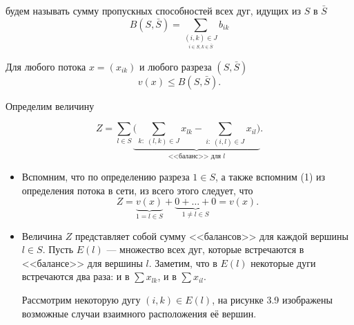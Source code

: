  будем называть сумму пропускных способностей всех дуг, идущих из $S$ в $\bar{S}$
\[
B(S, \bar{S}) = \sum_{\underset{i \in S, k \in \bar{S}}{(i, k) \in J}} b_{ik}
\]


Для любого потока $x = (x_{ik})$ и любого разреза $(S, \bar{S})$
\[
v(x) \le B(S, \bar{S}).
\]

\prooof

Определим величину

\[
Z = \sum_{l \in S} \underbrace{\bigg(\sum_{k:\;(l, k) \in J} x_{lk} - \sum_{i: \; (i, l) \in J} x_{il}\bigg)}_{\text{<<баланс>> для } l}.
\]

\begin{itemize}[nosep]
	\item[\fbox{1}] Вспомним, что по определению разреза $1 \in S$, а также вспомним (1) из определения потока в сети, из всего этого следует, что
	\[
	Z = \underbrace{v(x)}_{1 = l \in S} + \underbrace{0 + \dots + 0}_{1 \neq l \in S} = v(x).
	\]

	\item[\fbox{2}] Величина $Z$ представляет собой сумму <<балансов>> для каждой вершины $l \in S$. Пусть $E(l)$ --- множество всех дуг, которые встречаются в <<балансе>> для вершины $l$. Заметим, что в $E(l)$ некоторые дуги встречаются два раза: и в $\sum x_{lk}$, и в $\sum {x_{il}}$.
	
	Рассмотрим некоторую дугу $(i, k) \in E(l)$, на рисунке 3.9 изображены возможные случаи взаимного расположения её вершин.
	

\end{itemize}
